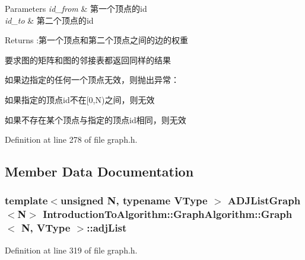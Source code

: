 \begin{DoxyParams}{Parameters}
{\em id\+\_\+from} & 第一个顶点的{\ttfamily id} \\
\hline
{\em id\+\_\+to} & 第二个顶点的{\ttfamily id} \\
\hline
\end{DoxyParams}
\begin{DoxyReturn}{Returns}
\+:第一个顶点和第二个顶点之间的边的权重
\end{DoxyReturn}
要求图的矩阵和图的邻接表都返回同样的结果

如果边指定的任何一个顶点无效，则抛出异常：


\begin{DoxyItemize}
\item 如果指定的顶点{\ttfamily id}不在{\ttfamily \mbox{[}0,N)}之间，则无效
\item 如果不存在某个顶点与指定的顶点{\ttfamily id}相同，则无效 
\end{DoxyItemize}

Definition at line 278 of file graph.\+h.



\subsection{Member Data Documentation}
\hypertarget{struct_introduction_to_algorithm_1_1_graph_algorithm_1_1_graph_a4442db9dd1bbb7fe543353df4fa1ba9f}{}
\subsubsection[{adj\+List}]{\setlength{\rightskip}{0pt plus 5cm}template$<$unsigned N, typename V\+Type $>$ {\bf A\+D\+J\+List\+Graph}$<$N$>$ {\bf Introduction\+To\+Algorithm\+::\+Graph\+Algorithm\+::\+Graph}$<$ N, V\+Type $>$\+::adj\+List}\label{struct_introduction_to_algorithm_1_1_graph_algorithm_1_1_graph_a4442db9dd1bbb7fe543353df4fa1ba9f}


Definition at line 319 of file graph.\+h.

\hypertarget{struct_introduction_to_algorithm_1_1_graph_algorithm_1_1_graph_a498323460ec613f12e1039afdca6c10a}{}
